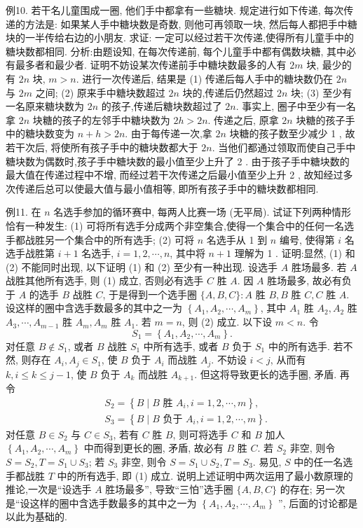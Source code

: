 例10. 若干名儿童围成一圈, 他们手中都拿有一些糖块.
规定进行如下传递, 每次传递的方法是: 如果某人手中糖块数是奇数, 则他可再领取一块, 然后每人都把手中糖块的一半传给右边的小朋友.
求证: 一定可以经过若干次传递,使得所有儿童手中的糖块数都相同.
分析:由题设知, 在每次传递前, 每个儿童手中都有偶数块糖, 其中必有最多者和最少者.
证明不妨设某次传递前手中糖块数最多的人有 $2 m$ 块, 最少的有 $2 n$ 块, $m>n$. 进行一次传递后, 结果是
(1) 传递后每人手中的糖块数仍在 $2 n$ 与 $2 m$ 之间;
(2) 原来手中糖块数超过 $2 n$ 块的,传递后仍然超过 $2 n$ 块;
(3) 至少有一名原来糖块数为 $2 n$ 的孩子,传递后糖块数超过了 $2 n$.
事实上, 圈子中至少有一名拿 $2 n$ 块糖的孩子的左邻手中糖块数为 $2 h> 2 n$. 传递之后, 原拿 $2 n$ 块糖的孩子手中的糖块数变为 $n+h>2 n$.
由于每传递一次,拿 $2 n$ 块糖的孩子数至少减少 1 , 故若干次后, 将使所有孩子手中的糖块数都大于 $2 n$. 当他们都通过领取而使自己手中糖块数为偶数时,孩子手中糖块数的最小值至少上升了 2 .
由于孩子手中糖块数的最大值在传递过程中不增, 而经过若干次传递之后最小值至少上升 2 , 故知经过多次传递后总可以使最大值与最小值相等, 即所有孩子手中的糖块数都相同.



例11. 在 $n$ 名选手参加的循环赛中, 每两人比赛一场 (无平局). 试证下列两种情形恰有一种发生:
(1) 可将所有选手分成两个非空集合,使得一个集合中的任何一名选手都战胜另一个集合中的所有选手;
(2) 可将 $n$ 名选手从 1 到 $n$ 编号, 使得第 $i$ 名选手战胜第 $i+1$ 名选手, $i=1,2, \cdots, n$, 其中将 $n+1$ 理解为 1 .
证明:显然, (1) 和 (2) 不能同时出现, 以下证明 (1) 和 (2) 至少有一种出现.
设选手 $A$ 胜场最多.
若 $A$ 战胜其他所有选手, 则 (1) 成立, 否则必有选手 $C$ 胜 $A$. 因 $A$ 胜场最多, 故必有负于 $A$ 的选手 $B$ 战胜 $C$, 于是得到一个选手圈 $\{A, B, C\}: A$ 胜 $B, B$ 胜 $C, C$ 胜 $A$.
设这样的圈中含选手数最多的其中之一为 $\left\{A_1, A_2, \cdots, A_m\right\}$, 其中 $A_1$ 胜 $A_2, A_2$ 胜 $A_3, \cdots, A_{m-1}$ 胜 $A_m, A_m$ 胜 $A_1$. 若 $m=n$, 则 (2) 成立.
以下设 $m<n$. 令
$$
S_1=\left\{A_1, A_2, \cdots, A_m\right\} .
$$
对任意 $B \notin S_1$, 或者 $B$ 战胜 $S_1$ 中所有选手, 或者 $B$ 负于 $S_1$ 中的所有选手.
若不然, 则存在 $A_i, A_j \in S_1$, 使 $B$ 负于 $A_i$ 而战胜 $A_j$. 不妨设 $i<j$, 从而有 $k, i \leqslant k \leqslant j-1$, 使 $B$ 负于 $A_k$ 而战胜 $A_{k+1}$. 但这将导致更长的选手圈, 矛盾.
再令
$$
\begin{aligned}
& S_2=\left\{B \mid B \text { 胜 } A_i, i=1,2, \cdots, m\right\}, \\
& S_3=\left\{B \mid B \text { 负于 } A_i, i=1,2, \cdots, m\right\} .
\end{aligned}
$$
对任意 $B \in S_2$ 与 $C \in S_3$, 若有 $C$ 胜 $B$, 则可将选手 $C$ 和 $B$ 加人 $\left\{A_1, A_2, \cdots, A_m\right\}$ 中而得到更长的圈, 矛盾, 故必有 $B$ 胜 $C$. 若 $S_2$ 非空, 则令 $S= S_2, T=S_1 \cup S_3$; 若 $S_3$ 非空, 则令 $S=S_1 \cup S_2, T=S_3$. 易见, $S$ 中的任一名选手都战胜 $T$ 中的所有选手, 即 (1) 成立.
说明上述证明中两次运用了最小数原理的推论,一次是“设选手 $A$ 胜场最多”, 导致“三怕”选手圈 $\{A, B, C\}$ 的存在; 另一次是“设这样的圈中含选手数最多的其中之一为 $\left\{A_1, A_2, \cdots, A_m\right\}$ ”, 后面的讨论都是以此为基础的.


